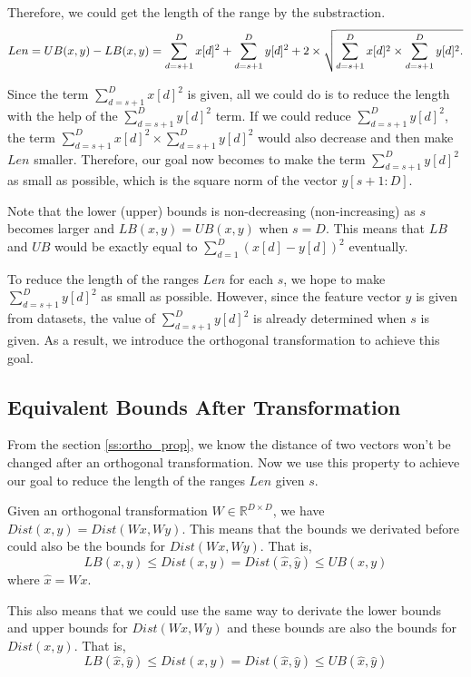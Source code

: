 Therefore, we could get the length of the range by the substraction.
\[
Len = UB(x,y) - LB(x,y) = \sum^D_{d=s+1}{x[d]^2}+\sum^D_{d=s+1}{y[d]^2} \notag \\
 +  2 \times \sqrt{\sum^D_{d=s+1}{x[d]^2}\times \sum^D_{d=s+1}{y[d]^2}.}\label{eq:len-range}
\]

Since the term $\sum^D_{d=s+1}{x[d]^2}$ is given, all we could do is to reduce the length with the help of the $\sum^D_{d=s+1}{y[d]^2}$ term.  If we could reduce $\sum^D_{d=s+1}{y[d]^2}$, the term $\sum^D_{d=s+1}{x[d]^2}\times \sum^D_{d=s+1}{y[d]^2}$ would also decrease and then make $Len$ smaller.  Therefore, our goal now becomes to make the term $\sum^D_{d=s+1}{y[d]^2}$ as small as possible, which is the square norm of the vector $y[s+1:D]$.

Note that the lower (upper) bounds is non-decreasing (non-increasing) as $s$ becomes larger and $LB(x,y)=UB(x,y)$ when $s=D$.  This means that $LB$ and $UB$ would be exactly equal to $\sum^D_{d=1}{(x[d]-y[d])^2}$ eventually.

To reduce the length of the ranges $Len$ for each $s$, we hope to make $\sum^D_{d=s+1}{y[d]^2}$ as small as possible.  However, since the feature vector $y$ is given from datasets, the value of $\sum^D_{d=s+1}{y[d]^2}$ is already  determined when $s$ is given.  As a result, we introduce the orthogonal transformation to achieve this goal.



\subsection{Equivalent Bounds After Transformation} %
\label{sub:equivalent_bounds_after_transformation}

From the section \ref{ss:ortho_prop}, we know the distance of two vectors won't be changed after an orthogonal transformation.  Now we use this property to achieve our goal to reduce the length of the ranges $Len$ given $s$.

Given an orthogonal transformation $W\in\mathbb{R}^{D\times D}$, we have $Dist(x,y)=Dist(Wx,Wy)$.  This means that the bounds we derivated before could also be the bounds for $Dist(Wx,Wy)$.  That is,
\[
LB(x,y)\leq Dist(x,y)=Dist(\hat{x},\hat{y}) \leq UB(x,y)
\]
where $\hat{x}=Wx$.

This also means that we could use the same way to derivate the lower bounds and upper bounds for $Dist(Wx,Wy)$ and these bounds are also the bounds for $Dist(x,y)$.  That is,
\[
LB(\hat{x},\hat{y})\leq Dist(x,y)=Dist(\hat{x},\hat{y}) \leq UB(\hat{x},\hat{y})
\]

